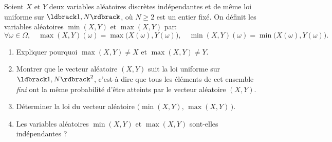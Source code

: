 \documentclass[a4paper,12pt,reqno]{amsart}
\begin{document}
\begin{exo}

  Soient $X$ et $Y$ deux variables aléatoires discrètes indépendantes et de même loi uniforme sur $\iintv{1,N}$, où $N\ge 2$ est un entier fixé. On définit les variables aléatoires $\min(X,Y)$ et $\max(X,Y)$ par:
  $
    \forall \omega\in\Omega, \quad
    \max(X,Y)(\omega)= \max\big(X(\omega),Y(\omega)\big),\quad
    \min(X,Y)(\omega)= \min\big(X(\omega),Y(\omega)\big).
  $
  \begin{enumerate}
    \item Expliquer pourquoi $\max(X,Y)\neq X$ et $\max(X,Y)\neq Y$.
    \item Montrer que le vecteur aléatoire $(X,Y)$ suit la loi uniforme sur $\iintv{1,N}^2$, c'est-à dire que tous les éléments de cet ensemble \emph{fini} ont la même probabilité d'être atteints par le vecteur aléatoire $(X,Y)$.
    \item Déterminer la loi du vecteur aléatoire $\big(\min(X,Y),\,\max(X,Y)\,\big)$.
    \item Les variables aléatoires $\min(X,Y)$ et $\max(X,Y)$ sont-elles indépendantes ?
  \end{enumerate}

\end{exo}
\end{document}
